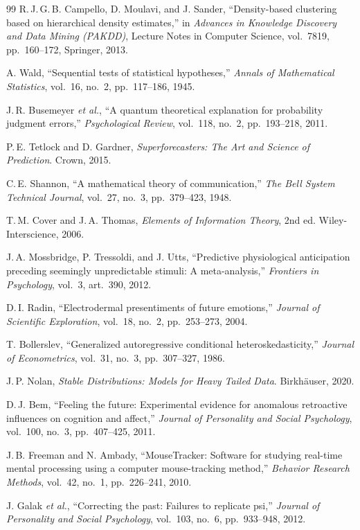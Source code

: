 \documentclass[11pt,letterpaper]{article}
\begin{document}
\begin{thebibliography}{99}
R.\,J.\,G.\,B. Campello, D. Moulavi, and J. Sander, ``Density-based clustering based on hierarchical density estimates,'' in \textit{Advances in Knowledge Discovery and Data Mining (PAKDD)}, Lecture Notes in Computer Science, vol.~7819, pp.~160--172, Springer, 2013.

A. Wald, ``Sequential tests of statistical hypotheses,'' \textit{Annals of Mathematical Statistics}, vol.~16, no.~2, pp.~117--186, 1945.

J.\,R. Busemeyer \textit{et al.}, ``A quantum theoretical explanation for probability judgment errors,'' \textit{Psychological Review}, vol.~118, no.~2, pp.~193--218, 2011.

P.\,E. Tetlock and D. Gardner, \textit{Superforecasters: The Art and Science of Prediction}. Crown, 2015.


C.\,E. Shannon, ``A mathematical theory of communication,'' \textit{The Bell System Technical Journal}, vol.~27, no.~3, pp.~379--423, 1948.

T.\,M. Cover and J.\,A. Thomas, \textit{Elements of Information Theory}, 2nd ed. Wiley-Interscience, 2006.

J.\,A. Mossbridge, P. Tressoldi, and J. Utts, ``Predictive physiological anticipation preceding seemingly unpredictable stimuli: A meta-analysis,'' \textit{Frontiers in Psychology}, vol.~3, art.~390, 2012.

D.\,I. Radin, ``Electrodermal presentiments of future emotions,'' \textit{Journal of Scientific Exploration}, vol.~18, no.~2, pp.~253--273, 2004.

T. Bollerslev, ``Generalized autoregressive conditional heteroskedasticity,'' \textit{Journal of Econometrics}, vol.~31, no.~3, pp.~307--327, 1986.

J.\,P. Nolan, \textit{Stable Distributions: Models for Heavy Tailed Data}. Birkh\"{a}user, 2020.

D.\,J. Bem, ``Feeling the future: Experimental evidence for anomalous retroactive influences on cognition and affect,'' \textit{Journal of Personality and Social Psychology}, vol.~100, no.~3, pp.~407--425, 2011.

J.\,B. Freeman and N. Ambady, ``MouseTracker: Software for studying real-time mental processing using a computer mouse-tracking method,'' \textit{Behavior Research Methods}, vol.~42, no.~1, pp.~226--241, 2010.

J. Galak \textit{et al.}, ``Correcting the past: Failures to replicate psi,'' \textit{Journal of Personality and Social Psychology}, vol.~103, no.~6, pp.~933--948, 2012.

\end{thebibliography}
\end{document}
